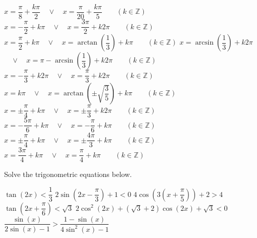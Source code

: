 \begin{Answer}\phantom{}
    
    	\Question $x=\dfrac{\pi}{8} + \dfrac{k\pi}{2} \quad \vee \quad  x=\dfrac{\pi}{20} + \dfrac{k\pi}{5} \qquad (k\in \mathbb{Z})$
    	\Question $x=-\dfrac{\pi}{2} + k\pi  \quad  \vee \quad  x=\dfrac{3\pi}{2} + k2\pi \qquad (k\in \mathbb{Z})$
    	\Question $x=\dfrac{\pi}{2} + k\pi \quad  \vee \quad   x=\arctan \left( \dfrac{1}{3}\right) + k\pi \qquad (k\in \mathbb{Z})$
    	\Question $x=\arcsin \left( \dfrac{1}{3}\right)+ k 2\pi$
    	$\quad  \vee \quad   x= \pi - \arcsin \left( \dfrac{1}{3}\right) + k 2\pi\qquad (k\in \mathbb{Z})$
    	\Question $x=-\dfrac{\pi}{3} + k2\pi  \quad  \vee \quad   x=\dfrac{\pi}{3} + k2\pi\qquad (k\in \mathbb{Z})$
    	\Question $x=k\pi \quad  \vee \quad   x=\arctan \left( \pm \sqrt{\dfrac{3}{5}}\right) + k\pi \qquad (k\in \mathbb{Z})$ 
    	\Question $x=\pm \dfrac{\pi}{4} + k\pi  \quad  \vee \quad   x= \pm \dfrac{\pi}{3} + k2\pi\qquad (k\in \mathbb{Z})$
    	\Question $x=-\dfrac{5\pi}{6} + k\pi  \quad  \vee \quad   x=-\dfrac{\pi}{6} + k\pi \qquad (k\in \mathbb{Z})$
    	\Question $x= \pm \dfrac{\pi}{4} + k\pi \quad  \vee \quad   x=\pm \dfrac{4\pi}{3} + k\pi \qquad (k\in \mathbb{Z})$
    	\Question $x= \dfrac{3\pi}{4} + k\pi \quad  \vee \quad   x= \dfrac{\pi}{4} + k\pi \qquad (k\in \mathbb{Z})$
    
\end{Answer}

\begin{Exercise} Solve the trigonometric equations below.
\begin{multicols}{2}
	\Question[difficulty = 1] $\tan(2x) < \dfrac{1}{3}$	
	\Question[difficulty = 1] $2\sin \left(2x - \dfrac{\pi}{3} \right) + 1 < 0$	
	\Question[difficulty = 1] $4\cos \left(3  \left(x + \dfrac{\pi}{5} \right)\right) + 2 > 4 $	 
	\Question[difficulty = 1] $\tan \left(2x + \dfrac{\pi}{6} \right)  < \sqrt{3}$	 
	\Question[difficulty = 2] $2 \cos^2 (2x) + (\sqrt{3} + 2) \cos(2x) + \sqrt{3} < 0 $ 
	\Question[difficulty = 3] $\dfrac{\sin(x)}{2\sin(x) - 1} > \dfrac{1-\sin(x)}{4\sin^2(x) - 1}$
    \EndCurrentQuestion
\end{multicols}

\end{Exercise}

